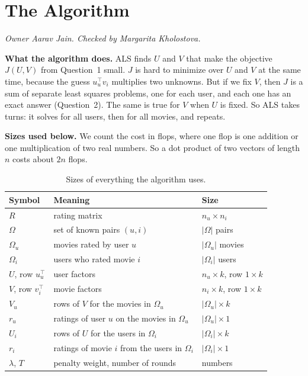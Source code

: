 
\section{The Algorithm}
\textit{Owner Aarav Jain. Checked by Margarita Kholostova.}

\textbf{What the algorithm does.} ALS finds $U$ and $V$ that make the objective $J(U,V)$ from Question~1 small. $J$ is hard to minimize over $U$ and $V$ at the same time, because the guess $u_u^\top v_i$ multiplies two unknowns. But if we fix $V$, then $J$ is a sum of separate least squares problems, one for each user, and each one has an exact answer (Question~2). The same is true for $V$ when $U$ is fixed. So ALS takes turns: it solves for all users, then for all movies, and repeats.

\textbf{Sizes used below.} We count the cost in flops, where one flop is one addition or one multiplication of two real numbers. So a dot product of two vectors of length $n$ costs about $2n$ flops.

\begin{table}[h]
\centering
\begin{tabular}{lll}
\hline
Symbol & Meaning & Size \\
\hline
$R$ & rating matrix & $n_u \times n_i$ \\
$\Omega$ & set of known pairs $(u,i)$ & $|\Omega|$ pairs \\
$\Omega_u$ & movies rated by user $u$ & $|\Omega_u|$ movies \\
$\Omega_i$ & users who rated movie $i$ & $|\Omega_i|$ users \\
$U$, row $u_u^\top$ & user factors & $n_u \times k$, row $1 \times k$ \\
$V$, row $v_i^\top$ & movie factors & $n_i \times k$, row $1 \times k$ \\
$V_u$ & rows of $V$ for the movies in $\Omega_u$ & $|\Omega_u| \times k$ \\
$r_u$ & ratings of user $u$ on the movies in $\Omega_u$ & $|\Omega_u| \times 1$ \\
$U_i$ & rows of $U$ for the users in $\Omega_i$ & $|\Omega_i| \times k$ \\
$r_i$ & ratings of movie $i$ from the users in $\Omega_i$ & $|\Omega_i| \times 1$ \\
$\lambda$, $T$ & penalty weight, number of rounds & numbers \\
\hline
\end{tabular}
\caption{Sizes of everything the algorithm uses.}
\label{tab:sizes}
\end{table}

